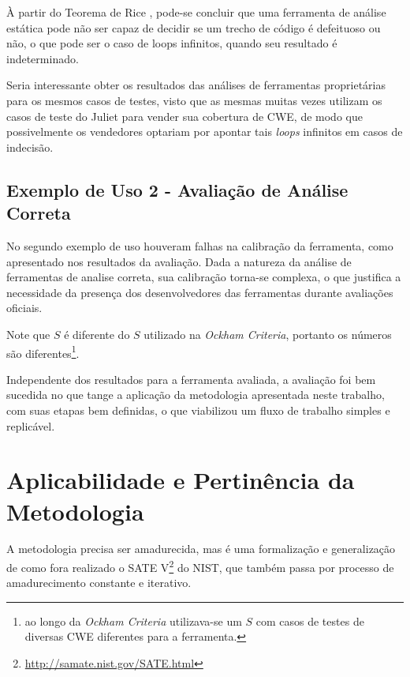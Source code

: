 À partir do Teorema de Rice \cite{rice}, pode-se concluir que uma ferramenta de análise estática pode não ser capaz de decidir se um trecho de código é defeituoso ou não, o que pode ser o caso de loops infinitos, quando seu resultado é indeterminado.

Seria interessante obter os resultados das análises de ferramentas proprietárias para os mesmos casos de testes, visto que as mesmas muitas vezes utilizam os casos de teste do Juliet para vender sua cobertura de CWE, de modo que possivelmente os vendedores optariam por apontar tais \textit{loops} infinitos em casos de indecisão.

\subsection*{Exemplo de Uso 2 - Avaliação de Análise Correta}

No segundo exemplo de uso houveram falhas na calibração da ferramenta, como apresentado nos resultados da avaliação. Dada a natureza da análise de ferramentas de analise correta, sua calibração torna-se complexa, o que justifica a necessidade da presença dos desenvolvedores das ferramentas durante avaliações oficiais.

Note que $S$ é diferente do $S$ utilizado na \textit{Ockham Criteria}, portanto os números são diferentes\footnote{ao longo da \textit{Ockham Criteria} utilizava-se um $S$ com casos de testes de diversas CWE diferentes para a ferramenta.}.

Independente dos resultados para a ferramenta avaliada, a avaliação foi bem sucedida no que tange a aplicação da metodologia apresentada neste trabalho, com suas etapas bem definidas, o que viabilizou um fluxo de trabalho simples e replicável. 

\section*{Aplicabilidade e Pertinência da Metodologia}

A metodologia precisa ser amadurecida, mas é uma formalização e generalização de como fora realizado o SATE V\footnote{\url{http://samate.nist.gov/SATE.html}} do NIST, que também passa por processo de amadurecimento constante e iterativo.

